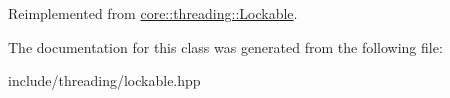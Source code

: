 Reimplemented from \hyperlink{classcore_1_1threading_1_1_lockable}{core\-::threading\-::\-Lockable}.



The documentation for this class was generated from the following file\-:\begin{DoxyCompactItemize}
\item 
include/threading/lockable.\-hpp\end{DoxyCompactItemize}
